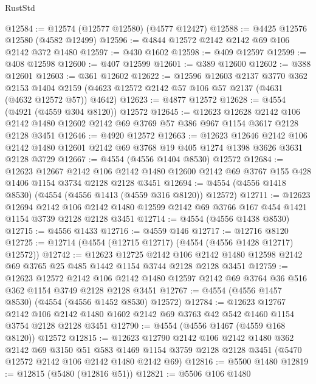 \begin{lexlean}{RustStd}
\begin{coremodule}
{\begin{coremodule}
{{{{{{{{{{{{{{{{@12584 := @12574 (@12577 @12580) (@4577 @12427)
@12588 := @4425 @12576 @12580 (@4582 @12499)
@12596 := @4844 @12572 @2142 @2142 @69 @106 @2142 @372 @1480
@12597 := @430 @1602
@12598 := @409 @12597
@12599 := @408 @12598
@12600 := @407 @12599
@12601 := @389 @12600
@12602 := @388 @12601
@12603 := @361 @12602
@12622 := @12596
    @12603
    @2137
    @3770
    @362
    @2153
    @1404
    @2159
    (@4623 @12572 @2142 @57 @106 @57 @2137 (@4631 (@4632 @12572 @57)) @4642)
@12623 := @4877 @12572
@12628 := @4554 (@4921 (@4559 @304 @8120)) @12572
@12645 := @12623
    @12628
    @2142
    @106
    @2142
    @1480
    @12602
    @2142
    @69
    @3769
    @57
    @386
    @967
    @1154
    @3617
    @2128
    @2128
    @3451
@12646 := @4920 @12572
@12663 := @12623
    @12646
    @2142
    @106
    @2142
    @1480
    @12601
    @2142
    @69
    @3768
    @19
    @405
    @1274
    @1398
    @3626
    @3631
    @2128
    @3729
@12667 := @4554 (@4556 @1404 @8530) @12572
@12684 := @12623
    @12667
    @2142
    @106
    @2142
    @1480
    @12600
    @2142
    @69
    @3767
    @155
    @428
    @1406
    @1154
    @3734
    @2128
    @2128
    @3451
@12694 := @4554 (@4556 @1418 @8530) (@4554 (@4556 @1413 (@4559 @316 @8120)) @12572)
@12711 := @12623
    @12694
    @2142
    @106
    @2142
    @1480
    @12599
    @2142
    @69
    @3766
    @167
    @454
    @1421
    @1154
    @3739
    @2128
    @2128
    @3451
@12714 := @4554 (@4556 @1438 @8530)
@12715 := @4556 @1433
@12716 := @4559 @146
@12717 := @12716 @8120
@12725 := @12714 (@4554 (@12715 @12717) (@4554 (@4556 @1428 @12717) @12572))
@12742 := @12623
    @12725
    @2142
    @106
    @2142
    @1480
    @12598
    @2142
    @69
    @3765
    @25
    @485
    @1442
    @1154
    @3744
    @2128
    @2128
    @3451
@12759 := @12623
    @12572
    @2142
    @106
    @2142
    @1480
    @12597
    @2142
    @69
    @3764
    @36
    @516
    @362
    @1154
    @3749
    @2128
    @2128
    @3451
@12767 := @4554 (@4556 @1457 @8530) (@4554 (@4556 @1452 @8530) @12572)
@12784 := @12623
    @12767
    @2142
    @106
    @2142
    @1480
    @1602
    @2142
    @69
    @3763
    @42
    @542
    @1460
    @1154
    @3754
    @2128
    @2128
    @3451
@12790 := @4554 (@4556 @1467 (@4559 @168 @8120)) @12572
@12815 := @12623
    @12790
    @2142
    @106
    @2142
    @1480
    @362
    @2142
    @69
    @3150
    @51
    @583
    @1469
    @1154
    @3759
    @2128
    @2128
    @3451
    (@5470 @12572 @2142 @106 @2142 @1480 @2142 @69)
@12816 := @5500 @1480
@12819 := @12815 (@5480 (@12816 @51))
@12821 := @5506 @106 @1480
}}}}}}}}}}}}}}}}
\end{coremodule}}
\end{coremodule}
\end{lexlean}
